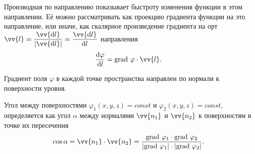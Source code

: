 \documentclass[11pt, a4paper]{article}
\theoremstyle{plain}
\theoremstyle{definition}
\theoremstyle{remark}
\renewcommand{\phi}{\ensuremath{\varphi}}
\begin{document}
Производная по направлению показывает быстроту изменения функции в этом направлении. Её можно рассматривать как проекцию градиента функции на это направление, или иначе, как скалярное произведение градиента на орт $\vv{l} = \dfrac{\vv{\dif l}}{|\vv{\dif l}|} = \dfrac{\vv{\dif l}}{\dif l}$ направления 
\begin{equation*}
     \dfrac{\dif \phi}{\dif l} = \text{grad } \phi \cdot \vv{l}.
\end{equation*}

Градиент поля $\phi$ в каждой точке пространства направлен по нормали к поверхности уровня.

Угол между поверхностями $\phi_1 \left(x, y, z\right) = const$ и $\phi_2 \left(x, y, z\right) = const$, определяется как угол $\alpha$ между нормалями $\vv{n_1}$ и $\vv{n_2}$ к поверхностям в точке их пересечения
\begin{equation*}
    \cos \alpha = \vv{n_1} \cdot \vv{n_2} = \dfrac{\text{grad } \phi_1 \cdot \text{grad } \phi_2}{|\text{grad } \phi_1| \cdot |\text{grad } \phi_2|}.
\end{equation*}

\end{document}
